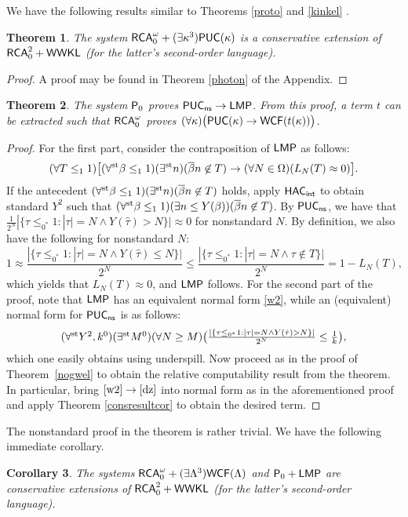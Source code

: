 \documentclass[reqno]{amsart}
\newtheorem{thm}{Theorem}
\newtheorem{cor}[thm]{Corollary}
\newcommand\be{\begin{equation}}
\newcommand\ee{\end{equation}}
\def\ns{\textup{\textsf{ns}}}
\def\RCA{\textup{\textsf{RCA}}}
\def\({\textup{(}}
\def\){\textup{)}}
\def\RCAo{\textup{\textsf{RCA}}_{0}^{\omega}}
\def\PUC{\textup{\textsf{PUC}}}
\def\WWKL{\textup{\textsf{WWKL}}}
\def\P{\textup{\textsf{P}}}
\def\PUC{\textup{\textsf{PUC}}}
\def\st{\textup{st}}
\def\di{\rightarrow}
\def\LMP{\textup{\textsf{LMP}}}
\def\WCF{\textup{\textsf{WCF}}}
\def\HAC{\textup{\textsf{HAC}}}
\def\INT{\textup{\textsf{int}}}
\numberwithin{equation}{section}
\numberwithin{thm}{section}
\begin{document}
\medskip
   
We have the following results similar to Theorems \ref{proto} and \ref{kinkel} . %
\begin{thm}\label{proto2}
The system $\RCA_{0}^{\omega}+(\exists \kappa^{3})\PUC(\kappa)$ is a conservative extension of $\RCA_{0}^{2}+\WWKL$ \(for the latter's second-order language\).   
\end{thm}
\begin{proof}
A proof may be found in Theorem \ref{photon} of the Appendix. 
\end{proof}
\begin{thm}
The system $\P_{0}$ proves $\PUC_{\ns}\di \LMP$.   From this proof, a term $t$ can be extracted such that $\RCAo$ proves $(\forall \kappa)\big(\PUC(\kappa)\di \WCF(t(\kappa))\big)$.
\end{thm}
\begin{proof}
For the first part, consider the contraposition of $\LMP$ as follows:
\[
(\forall   T \leq_{1}1)\big[  (\forall^{\st} \beta\leq_{1}1)(\exists^{\st}n)(\overline{\beta}n\not\in T)\di  (\forall N\in \Omega)(L_{N}(T)\approx 0) \big].
\]
If the antecedent $(\forall^{\st} \beta\leq_{1}1)(\exists^{\st}n)(\overline{\beta}n\not\in T)$ holds, apply $\HAC_{\INT}$ to obtain standard $Y^{2}$ such that 
$(\forall^{\st} \beta\leq_{1}1)(\exists n\leq Y(\beta) )(\overline{\beta}n\not\in T)$.  By $\PUC_{\ns}$, we have that $ \frac{1}{2^{N}}{| \{ \tau\leq_{0^{*}}1 : |\tau|=N\wedge Y(\hat{\tau})>N \}   |}  \approx 0  $ for nonstandard $N$.  By definition, we also have the following for nonstandard $N$:
\[\textstyle
1\approx  \frac{| \{ \tau\leq_{0^{*}}1 : |\tau|=N\wedge Y(\hat{\tau})\leq N \}   |}{2^{N}}  \leq   \frac{| \{ \tau\leq_{0^{*}}1 : |\tau|=N\wedge  \tau \not  \in T \}   |}{2^{N}}=1-L_{N}(T), 
\]
which yields that $L_{N}(T)\approx 0$, and $\LMP$ follows.  For the second part of the proof, note that $\LMP$ has an equivalent normal form \eqref{w2}, while an (equivalent) normal form for $\PUC_{\ns}$ is as follows:
\be\textstyle\label{dz}
(\forall^{\st} Y^{2}, k^{0})(\exists^{\st}M^{0})(\forall N\geq M)\big( \frac{| \{ \tau\leq_{0^{*}}1 : |\tau|=N\wedge Y(\hat{\tau})>N \}   |}{2^{N}}  \leq \frac{1}{{k}}  \big),   %
\ee
which one easily obtains using underspill.  Now proceed as in the proof of Theorem~\ref{nogwel} to obtain the relative computability result from the theorem.  In particular, bring $\eqref{w2}\di \eqref{dz}$ into normal form as in the aforementioned proof and apply Theorem \ref{consresultcor} to obtain the desired term.  
\end{proof}
The nonstandard proof in the theorem is rather trivial.  We have the following immediate corollary.  
\begin{cor}\label{proto3}
The systems $\RCA_{0}^{\omega}+(\exists \Lambda^{3})\WCF(\Lambda)$ and $\P_{0}+\LMP$ are conservative extensions of $\RCA_{0}^{2}+\WWKL$ \(for the latter's second-order language\).  
\end{cor}
\end{document}
